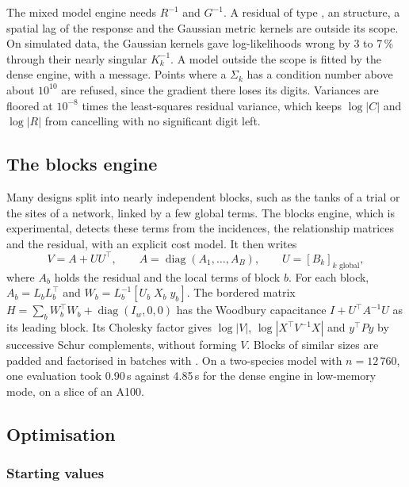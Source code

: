 \documentclass[article,nojss]{jss}
\newcommand{\diag}{\operatorname{diag}}
\begin{document}
The mixed model engine needs $R^{-1}$ and $G^{-1}$. A residual of type
, an  structure, a spatial lag of the response and the
Gaussian metric kernels are outside its scope. On simulated data, the
Gaussian kernels gave log-likelihoods wrong by 3 to 7\,\% through their nearly
singular $K_k^{-1}$. A model outside the scope is fitted by the dense engine,
with a message. Points where a $\Sigma_k$ has a condition number above about
$10^{10}$ are refused, since the gradient there loses its digits. Variances
are floored at $10^{-8}$ times the least-squares residual variance, which keeps
$\log|C|$ and $\log|R|$ from cancelling with no significant digit left.

\subsection{The blocks engine}\label{sec:blocks}

Many designs split into nearly independent blocks, such as the tanks of a
trial or the sites of a network, linked by a few global terms. The blocks
engine, which is experimental, detects these terms from the incidences, the
relationship matrices and the residual, with an explicit cost model. It then
writes
\begin{equation}\label{eq:blocks}
  V = A + UU^\top, \qquad A = \diag(A_1, \dots, A_B), \qquad
  U = [B_k]_{k \text{ global}} ,
\end{equation}
where $A_b$ holds the residual and the local terms of block $b$. For each
block, $A_b = L_bL_b^\top$ and $W_b = L_b^{-1}[U_b \; X_b \; y_b]$. The
bordered matrix $H = \sum_b W_b^\top W_b + \diag(I_w, 0, 0)$ has the Woodbury
capacitance $I + U^\top A^{-1} U$ as its leading block. Its Cholesky factor gives
$\log|V|$, $\log|X^\top V^{-1}X|$ and $y^\top P y$ by successive Schur
complements, without forming $V$. Blocks of similar sizes are padded and
factorised in batches with . On a two-species model with
$n = 12\,760$, one evaluation took 0.90\,s against 4.85\,s for the dense engine
in low-memory mode, on a slice of an A100.

\subsection{Optimisation}\label{sec:optim}

\subsubsection{Starting values}
\end{document}
